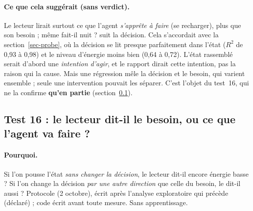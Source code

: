 \documentclass[11pt,a4paper]{article}
\newcommand{\code}[1]{\texttt{\detokenize{#1}}}
\begin{document}
\paragraph{Ce que cela suggérait (sans verdict).} Le lecteur lirait surtout ce que l'agent
\emph{s'apprête à faire} (se recharger), plus que son besoin ; même \og fait-il nuit ? \fg{}
suit la décision. Cela s'accordait avec la section~\ref{sec-probe}, où la décision se lit
presque parfaitement dans l'état ($R^2$ de 0,93 à 0,98) et le niveau d'énergie moins bien
(0,64 à 0,72). L'état rassemblé serait d'abord une \emph{intention d'agir}, et le
\og rapport \fg{} dirait cette intention, pas la raison qui la cause. Mais une régression
mêle la décision et le besoin, qui varient ensemble ; seule une intervention pouvait les
séparer. C'est l'objet du test~16, qui ne la confirme \textbf{qu'en partie}
(section~\ref{sec-t16}).

\subsection{Test 16 : le lecteur dit-il le besoin, ou ce que l'agent va faire ?}
\label{sec-t16}

\paragraph{Pourquoi.} Si l'on pousse l'état \emph{sans changer la décision}, le lecteur
dit-il encore \og énergie basse \fg{} ? Si l'on change la décision \emph{par une autre
direction} que celle du besoin, le dit-il aussi ? Protocole \code{4f84752} (2 octobre),
écrit après l'analyse exploratoire qui précède (déclaré) ; code \code{05f6068} écrit avant
toute mesure. Sans apprentissage.
\end{document}
